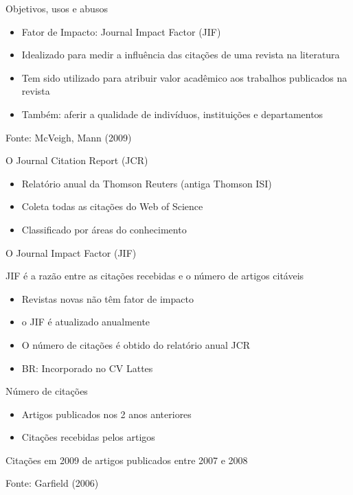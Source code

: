 \documentclass{beamer}
\begin{document}
\begin{frame}{Objetivos, usos e abusos}
  \begin{itemize}
  \item Fator de Impacto: Journal Impact Factor (JIF)
  \item Idealizado para medir a influência das citações de uma revista na literatura
  \item Tem sido utilizado para atribuir valor acadêmico aos trabalhos publicados na revista
  \item Também: aferir a qualidade de indivíduos, instituições e departamentos
  \end{itemize}

  \vfill
  Fonte: McVeigh, Mann (2009)
\end{frame}

\begin{frame}{O Journal Citation Report (JCR)}
  \begin{itemize}
  \item Relatório anual da Thomson Reuters (antiga Thomson ISI)
  \item Coleta todas as citações do Web of Science
  \item Classificado por áreas do conhecimento
  \end{itemize}
\end{frame}

\begin{frame}{O Journal Impact Factor (JIF)}
  \begin{definition}
    JIF é a razão entre as citações recebidas e o número de artigos citáveis
  \end{definition}
  \begin{itemize}
  \item Revistas novas não têm fator de impacto
  \item o JIF é atualizado anualmente
  \item O número de citações é obtido do relatório anual JCR
  \item BR: Incorporado no CV Lattes
  \end{itemize}
\end{frame}

\begin{frame}{Número de citações}

  \begin{itemize}
  \item Artigos publicados nos 2 anos anteriores
  \item Citações recebidas pelos artigos
  \end{itemize}
  \begin{example}
    Citações em 2009 de artigos publicados entre 2007 e 2008
  \end{example}

  \vfill
  Fonte: Garfield (2006)
\end{frame}
\end{document}
